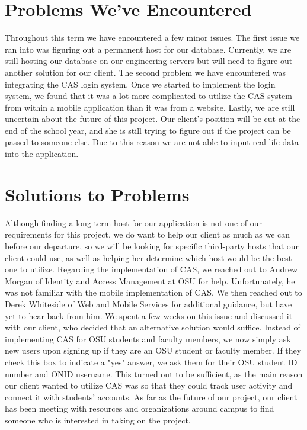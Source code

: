 \documentclass[onecolumn, draftclsnofoot,10pt, compsoc]{IEEEtran}
\begin{document}
\section{Problems We've Encountered}
  Throughout this term we have encountered a few minor issues. The first issue we ran into was figuring out a permanent host for our database. Currently, we are still hosting our database on our engineering servers but will need to figure out another solution for our client. The second problem we have encountered was integrating the CAS login system. Once we started to implement the login system, we found that it was a lot more complicated to utilize the CAS system from within a mobile application than it was from a website. Lastly, we are still uncertain about the future of this project. Our client's position will be cut at the end of the school year, and she is still trying to figure out if the project can be passed to someone else. Due to this reason we are not able to input real-life data into the application.

\section{Solutions to Problems}
  Although finding a long-term host for our application is not one of our requirements for this project, we do want to help our client as much as we can before our departure, so we will be looking for specific third-party hosts that our client could use, as well as helping her determine which host would be the best one to utilize. Regarding the implementation of CAS, we reached out to Andrew Morgan of Identity and Access Management at OSU for help. Unfortunately, he was not familiar with the mobile implementation of CAS. We then reached out to Derek Whiteside of Web and Mobile Services for additional guidance, but have yet to hear back from him. We spent a few weeks on this issue and discussed it with our client, who decided that an alternative solution would suffice. Instead of implementing CAS for OSU students and faculty members, we now simply ask new users upon signing up if they are an OSU student or faculty member. If they check this box to indicate a "yes" answer, we ask them for their OSU student ID number and ONID username. This turned out to be sufficient, as the main reason our client wanted to utilize CAS was so that they could track user activity and connect it with students' accounts. As far as the future of our project, our client has been meeting with resources and organizations around campus to find someone who is interested in taking on the project.
\end{document}
